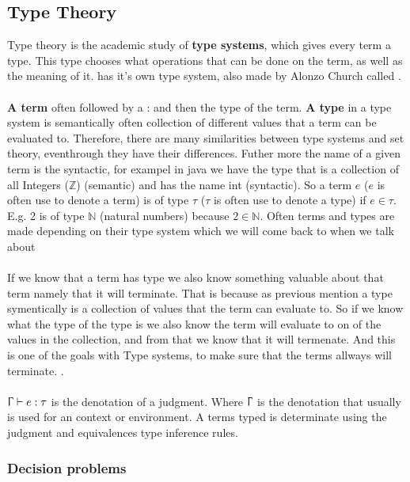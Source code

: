 \subsection{Type Theory}
\label{Type Theory}
Type theory is the academic study of \textbf{type systems}, 
which gives every term a type. This type chooses what operations 
that can be done on the term, as well as the meaning of it. 
 has it's own type system, also made 
by Alonzo Church called .
\\ \\
\textbf{A term} often followed by a : and then the type of the term.
\textbf{A type} in a type system is semantically often collection of different
values that a term can be evaluated to. Therefore, there are many 
similarities between type systems and set theory, eventhrough they 
have their differences. Futher more the name of a given term is the syntactic, 
for exampel in java we have the type that  is a collection of all Integers ($\mathbb{Z}$) (semantic) 
and has the name int (syntactic).
So a term $e$ ($e$ is often use to denote a term) is of type 
$\tau$ ($\tau$ is often use to denote a type) if $e \in \tau$. 
E.g. 2 is of type $\mathbb{N}$ (natural numbers) because 
$2 \in \mathbb{N}$. Often terms and types are made depending on their 
type system which we will come back to when we talk about 
\\ \\
If we know that a term has type we also know something valuable about that term namely that it will terminate.
That is because as previous mention a type symentically is a collection of values that the term can evaluate to. 
So if we know what the type of the type is we also know the term will evaluate to on of the values in the collection, and
from that we know that it will termenate. And this is one of the goals with Type systems, to make sure that the 
terms allways will terminate. 
. 
\\ \\
$\Upgamma \vdash e:\tau$ is the denotation of a judgment. 
Where $\Upgamma$ is the denotation that usually is used for an 
context or environment. A terms typed is determinate using the 
judgment and equivalences type inference rules.

\subsubsection{Decision problems}

